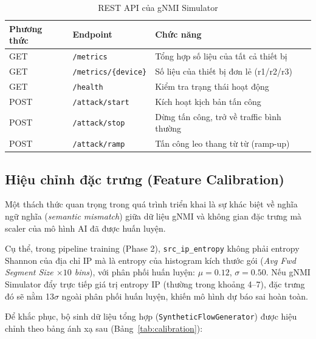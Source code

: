 \documentclass[12pt,a4paper]{article}
\begin{document}
\begin{table}[H]
\centering
\caption{REST API của gNMI Simulator}
\label{tab:gnmi_api}
\begin{tabular}{llp{7cm}}
\toprule
\textbf{Phương thức} & \textbf{Endpoint} & \textbf{Chức năng} \\
\midrule
GET  & \texttt{/metrics}               & Tổng hợp số liệu của tất cả thiết bị \\
GET  & \texttt{/metrics/\{device\}}    & Số liệu của thiết bị đơn lẻ (r1/r2/r3) \\
GET  & \texttt{/health}                & Kiểm tra trạng thái hoạt động \\
POST & \texttt{/attack/start}          & Kích hoạt kịch bản tấn công \\
POST & \texttt{/attack/stop}           & Dừng tấn công, trở về traffic bình thường \\
POST & \texttt{/attack/ramp}           & Tấn công leo thang từ từ (ramp-up) \\
\bottomrule
\end{tabular}
\end{table}

\subsection{Hiệu chỉnh đặc trưng (Feature Calibration)}

Một thách thức quan trọng trong quá trình triển khai là sự khác biệt về nghĩa ngữ nghĩa (\textit{semantic mismatch}) giữa dữ liệu gNMI và không gian đặc trưng mà scaler của mô hình AI đã được huấn luyện.

Cụ thể, trong pipeline training (Phase 2), \texttt{src\_ip\_entropy} không phải entropy Shannon của địa chỉ IP mà là entropy của histogram kích thước gói (\textit{Avg Fwd Segment Size $\times 10$ bins}), với phân phối huấn luyện: $\mu = 0.12$, $\sigma = 0.50$. Nếu gNMI Simulator đẩy trực tiếp giá trị entropy IP (thường trong khoảng 4--7), đặc trưng đó sẽ nằm 13$\sigma$ ngoài phân phối huấn luyện, khiến mô hình dự báo sai hoàn toàn.

Để khắc phục, bộ sinh dữ liệu tổng hợp (\texttt{SyntheticFlowGenerator}) được hiệu chỉnh theo bảng ánh xạ sau (Bảng~\ref{tab:calibration}):
\end{document}
